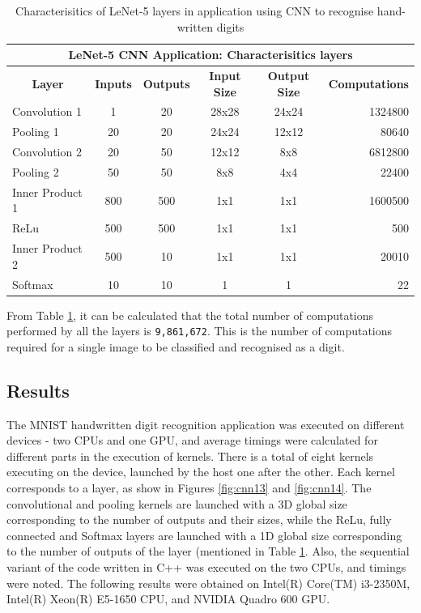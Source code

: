 \begin{table}[h!]
\centering
 \caption{Characterisitics of LeNet-5 layers in application using CNN to recognise hand-written digits}
 \vspace{3mm}
 \renewcommand\arraystretch{1.4}
 \begin{tabular}{ | m{7em} | c | c | c | c | r | }
 \hline
 \multicolumn{6}{|c|}{LeNet-5 CNN Application: Characterisitics layers} \\
 \hline
 \multicolumn{1}{|c|}{\bfseries Layer} & \multicolumn{1}{c|}{\bfseries Inputs} & \multicolumn{1}{c|}{\bfseries Outputs} & \multicolumn{1}{c|}{\bfseries Input Size} & \multicolumn{1}{c|}{\bfseries Output Size} & \multicolumn{1}{c|}{\bfseries Computations} \\
 \hline
 Convolution 1 & 1 & 20 & 28x28 & 24x24 & 1324800 \\
 \hline
 Pooling 1 & 20 & 20 & 24x24 & 12x12 & 80640 \\
 \hline
 Convolution 2 & 20 & 50 & 12x12 & 8x8 & 6812800 \\ 
 \hline
 Pooling 2 & 50 & 50 & 8x8 & 4x4 & 22400 \\
 \hline
 Inner Product 1 & 800 & 500 & 1x1 & 1x1 & 1600500 \\
 \hline
 ReLu & 500 & 500 & 1x1 & 1x1 & 500 \\
 \hline
 Inner Product 2 & 500 & 10 & 1x1 & 1x1 & 20010 \\
 \hline
 Softmax & 10 & 10 &  1 & 1 & 22 \\
 \hline
 \end{tabular}
 \label{table:mnist_layers_comp}
\end{table}
From Table \ref{table:mnist_layers_comp}, it can be calculated that the total number of computations performed by all the layers is \verb|9,861,672|. This is the number of computations required for a single image to be classified and recognised as a digit.

\subsection{Results}
\label{sect5_3_2}
The MNIST handwritten digit recognition application was executed on different devices - two CPUs and one GPU, and average timings were calculated for different parts in the execution of kernels. There is a total of eight kernels executing on the device, launched by the host one after the other. Each kernel corresponds to a layer, as show in Figures \ref{fig:cnn13} and \ref{fig:cnn14}. The convolutional and pooling kernels are launched with a 3D global size corresponding to the number of outputs and their sizes, while the ReLu, fully connected and Softmax layers are launched with a 1D global size corresponding to the number of outputs of the layer (mentioned in Table \ref{table:mnist_layers_comp}.  Also, the sequential variant of the code written in C++ was executed on the two CPUs, and timings were noted. \newline\newline
The following results were obtained on Intel(R) Core(TM) i3-2350M, Intel(R) Xeon(R) E5-1650 CPU, and NVIDIA Quadro 600 GPU.

